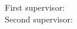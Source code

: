 \thispagestyle{empty}


\begin{flushleft}
    {\large
     First supervisor:  \getSupervisorOne \\[1mm]
     Second supervisor: \getSupervisorTwo \\
     }
\end{flushleft}

\cleardoublepage{}

